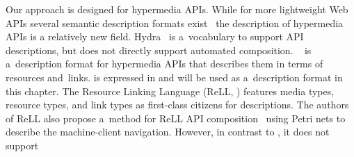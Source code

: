 Our approach is designed for hypermedia APIs. While for more lightweight Web APIs several semantic description formats exist~\cite{verborgh_rest_2014}
% 
the description of hypermedia APIs is a relatively new field.
Hydra~\cite{HydraVocabulary} is a~vocabulary to support API descriptions,
but does not directly support automated composition.
\restdesc~\cite{verborgh_wsrest_2012}
is a~description format
for hypermedia APIs that describes them in terms of resources and~links.
\restdesc is expressed in \nthree
and will be used as a~description format in this chapter.
The Resource Linking Language (ReLL, \cite{ReLL}) features media types, resource types, and link types as first-class citizens for descriptions.
The authors of ReLL also propose a~method
for ReLL API composition~\cite{ReLLComposition}
using Petri nets to describe the machine-client navigation.
However, in contrast to \restdesc, it does not support
